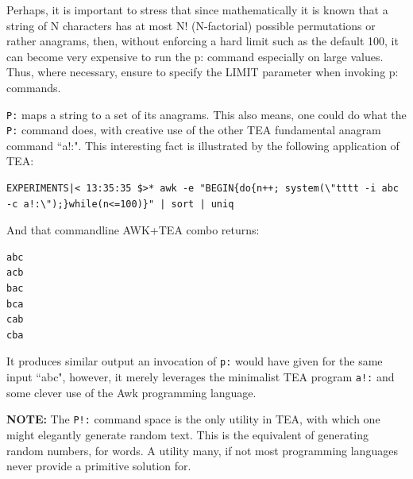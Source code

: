 \documentclass[a4paper, 18pt]{book} %
\begin{document}
{{\vspace{2em}

Perhaps, it is important to stress that since mathematically it is known that a string of N characters has at most N! (N-factorial) possible permutations or rather anagrams, then, without enforcing a hard limit such as the default 100, it can become very expensive to run the p: command especially on large values. Thus, where necessary, ensure to specify the LIMIT parameter when invoking p: commands.

\vspace{2em}


\texttt{P:} maps a string to a set of its anagrams. This also means, one could do what the \texttt{P:} command does, with creative use of the other TEA fundamental anagram command ``a!:". This interesting fact is illustrated by the following application of TEA:

\vspace{2em}

  \begin{tcolorbox}[myterminalstyle, title=Simulating P:ABC using AWK and A:]
  \begin{lstlisting}[breaklines=true]
EXPERIMENTS|< 13:35:35 $>* awk -e "BEGIN{do{n++; system(\"tttt -i abc -c a!:\");}while(n<=100)}" | sort | uniq
  \end{lstlisting}
  \end{tcolorbox}

\vspace{2em}

And that commandline AWK+TEA combo returns:

\vspace{2em}


\begin{verbatim}
abc
acb
bac
bca
cab
cba
\end{verbatim}

\vspace{2em}


It produces similar output an invocation of \texttt{p:} would have given for the same input ``abc", however, it merely leverages the minimalist TEA program \texttt{a!:} and some clever use of the Awk programming language.


\vspace{2em}


\textbf{NOTE:} The \texttt{P!:} command space is the only utility in TEA, with which one might elegantly generate random text. This is the equivalent of generating random numbers, for words. A utility many, if not most programming languages never provide a primitive solution for.

}}
\end{document}
